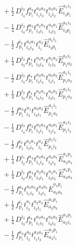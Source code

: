 \documentclass[11pt]{article}
\begin{document}
\begin{align}
&\quad + \tfrac{1}{2}\, D^{i_{3}}_{i_{4}} f^{a_{2}}_{p_{1}} t^{a_{2}a_{3}}_{i_{1}i_{3}} t^{a_{3}a_{1}}_{i_{4}i_{2}} \hat{E}^{a_{1}i_{1}}_{i_{2}p_{1}} \\
&\quad - \tfrac{1}{4}\, D^{i_{3}}_{i_{4}} f^{a_{2}}_{p_{1}} t^{a_{2}a_{3}}_{i_{3}i_{1}} t^{a_{3}a_{1}}_{i_{4}i_{2}} \hat{E}^{a_{1}i_{1}}_{i_{2}p_{1}} \\
&\quad - \tfrac{1}{2}\, f^{i_{3}}_{p_{1}} t^{a_{2}a_{1}}_{i_{3}i_{2}} t^{a_{2}}_{i_{1}} \hat{E}^{a_{1}i_{1}}_{i_{2}p_{1}} \\
&\quad + \tfrac{1}{4}\, D^{i_{2}}_{i_{3}} f^{i_{4}}_{p_{1}} t^{a_{3}a_{1}}_{i_{2}i_{4}} t^{a_{3}a_{2}}_{i_{1}i_{3}} \hat{E}^{a_{1}i_{1}}_{p_{1}a_{2}} \\
&\quad - \tfrac{1}{2}\, D^{i_{2}}_{i_{3}} f^{i_{4}}_{p_{1}} t^{a_{3}a_{1}}_{i_{2}i_{4}} t^{a_{3}a_{2}}_{i_{3}i_{1}} \hat{E}^{a_{1}i_{1}}_{p_{1}a_{2}} \\
&\quad + \tfrac{1}{4}\, D^{i_{2}}_{i_{3}} f^{i_{4}}_{p_{1}} t^{a_{3}a_{1}}_{i_{4}i_{2}} t^{a_{3}a_{2}}_{i_{3}i_{1}} \hat{E}^{a_{1}i_{1}}_{p_{1}a_{2}} \\
&\quad - \tfrac{1}{2}\, f^{a_{3}}_{p_{1}} t^{a_{1}}_{i_{2}} t^{a_{3}a_{2}}_{i_{2}i_{1}} \hat{E}^{a_{1}i_{1}}_{p_{1}a_{2}} \\
&\quad - \tfrac{1}{4}\, D^{i_{3}}_{i_{4}} f^{a_{2}}_{p_{1}} t^{a_{2}a_{3}}_{i_{3}i_{1}} t^{a_{3}a_{1}}_{i_{2}i_{4}} \hat{E}^{a_{1}i_{1}}_{p_{1}i_{2}} \\
&\quad - \tfrac{1}{2}\, f^{i_{3}}_{p_{1}} t^{a_{2}a_{1}}_{i_{2}i_{3}} t^{a_{2}}_{i_{1}} \hat{E}^{a_{1}i_{1}}_{p_{1}i_{2}} \\
&\quad + \tfrac{1}{4}\, D^{i_{1}}_{i_{2}} f^{a_{4}}_{p_{1}} t^{a_{2}a_{3}}_{i_{1}i_{3}} t^{a_{4}a_{1}}_{i_{3}i_{2}} \hat{E}^{a_{1}p_{1}}_{a_{2}a_{3}} \\
&\quad + \tfrac{1}{4}\, D^{i_{1}}_{i_{2}} f^{a_{4}}_{p_{1}} t^{a_{2}a_{3}}_{i_{3}i_{1}} t^{a_{4}a_{1}}_{i_{2}i_{3}} \hat{E}^{a_{1}p_{1}}_{a_{2}a_{3}} \\
&\quad - \tfrac{1}{2}\, f^{a_{4}}_{p_{1}} t^{a_{2}a_{3}}_{i_{1}i_{2}} t^{a_{4}a_{1}}_{i_{2}i_{1}} \hat{E}^{a_{1}p_{1}}_{a_{2}a_{3}} \\
&\quad + \tfrac{1}{2}\, f^{i_{1}}_{p_{1}} t^{a_{1}}_{i_{2}} t^{a_{2}a_{3}}_{i_{2}i_{1}} \hat{E}^{a_{1}p_{1}}_{a_{2}a_{3}} \\
&\quad + \tfrac{1}{4}\, D^{i_{2}}_{i_{3}} f^{i_{4}}_{p_{1}} t^{a_{3}a_{1}}_{i_{1}i_{2}} t^{a_{3}a_{2}}_{i_{4}i_{3}} \hat{E}^{a_{1}p_{1}}_{a_{2}i_{1}} \\
&\quad - \tfrac{1}{2}\, f^{a_{3}}_{p_{1}} t^{a_{2}}_{i_{2}} t^{a_{3}a_{1}}_{i_{1}i_{2}} \hat{E}^{a_{1}p_{1}}_{a_{2}i_{1}} \\

\end{align}
\end{document}
